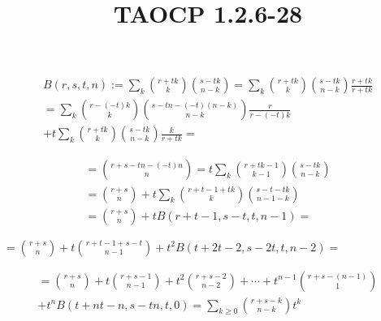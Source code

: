 \documentclass{article}
\title{TAOCP 1.2.6\mbox{-}28}
\begin{document}
\maketitle

\begin{multline*}
B(r,s,t,n) := \sum_{k} \binom{r+tk}{k}\binom{s-tk}{n-k} = \sum_{k} \binom{r+tk}{k}\binom{s-tk}{n-k}\frac{r + tk}{r+tk} \\
= \sum_{k} \binom{r-(-t)k}{k}\binom{s-tn-(-t)(n-k)}{n-k}\frac{r}{r-(-t)k} \\
+ t \sum_{k} \binom{r+tk}{k}\binom{s-tk}{n-k}\frac{k}{r+tk} =
\end{multline*}

\begin{multline*}
= \binom{r+s-tn-(-t)n}{n} = t \sum_{k} \binom{r+tk-1}{k-1}\binom{s-tk}{n-k} \\
= \binom{r+s}{n} + t \sum_{k} \binom{r+t-1+tk}{k}\binom{s - t - tk}{n-1-k} \\
= \binom{r+s}{n} + tB(r+t-1,s-t,t,n-1) =
\end{multline*}

\( = \binom{r+s}{n} + t\binom{r+t-1+s-t}{n-1} + t^{2}B(t+2t-2,s-2t,t,n-2) = \)

\begin{multline*}
= \binom{r+s}{n} + t \binom{r+s-1}{n-1} + t^{2} \binom{r+s-2}{n-2} + \cdots + t^{n-1} \binom{r+s-(n-1)}{1} \\
+ t^{n} B(t+nt-n,s-tn,t,0) = \sum_{k \geq 0} \binom{r+s-k}{n-k}t^{k}
\end{multline*}
\end{document}

